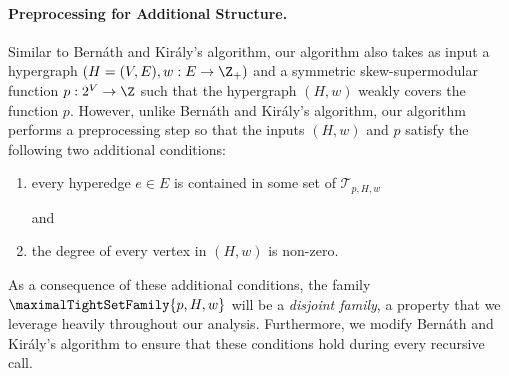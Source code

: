 \paragraph{Preprocessing for Additional Structure.}
Similar to Bern\'{a}th and Kir\'{a}ly's algorithm, our algorithm also takes as input a hypergraph $(H=(V, E), w: E\rightarrow \Z_+)$ and a symmetric skew-supermodular function $p: 2^V\rightarrow \Z$ such that the hypergraph $(H,w)$ weakly covers the function $p$. 
However, unlike Bern\'{a}th and Kir\'{a}ly's algorithm, our algorithm performs a preprocessing step so that the inputs $(H,w)$ and $p$ satisfy the following two additional conditions: 
\begin{enumerate}[label=(\alph*)]
    \item \hypertarget{WeakToStrong(a)}{every hyperedge $e\in E$ is contained in some set of $\mathcal{T}_{p, H, w}$} and 
    \item \hypertarget{WeakToStrong(b)}{the degree of every vertex in $(H, w)$ is non-zero.}
\end{enumerate}
As a consequence of these additional conditions, the family $\maximalTightSetFamily{p, H, w}$ will be a \emph{disjoint family},  
a property that we leverage heavily throughout our analysis.
Furthermore, we modify Bern\'{a}th and Kir\'{a}ly's algorithm to ensure that these conditions hold during every recursive call.

